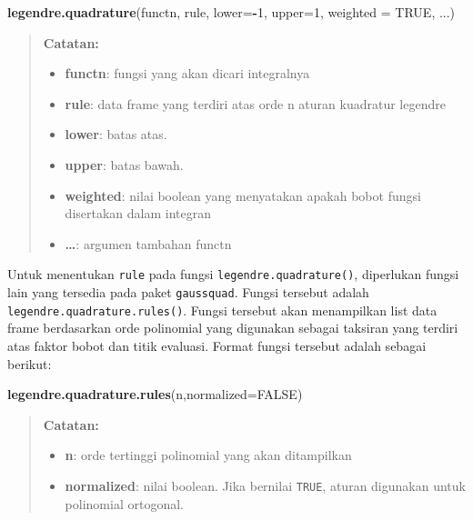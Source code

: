 \documentclass[]{book}
\newenvironment{Shaded}{\begin{snugshade}}{\end{snugshade}}
\newcommand{\DataTypeTok}[1]{\textcolor[rgb]{0.13,0.29,0.53}{#1}}
\newcommand{\DecValTok}[1]{\textcolor[rgb]{0.00,0.00,0.81}{#1}}
\newcommand{\KeywordTok}[1]{\textcolor[rgb]{0.13,0.29,0.53}{\textbf{#1}}}
\newcommand{\NormalTok}[1]{#1}
\newcommand{\OperatorTok}[1]{\textcolor[rgb]{0.81,0.36,0.00}{\textbf{#1}}}
\newcommand{\OtherTok}[1]{\textcolor[rgb]{0.56,0.35,0.01}{#1}}
\providecommand{\tightlist}{%
  \setlength{\itemsep}{0pt}\setlength{\parskip}{0pt}}
\theoremstyle{definition}
\theoremstyle{definition}
\theoremstyle{definition}
\theoremstyle{remark}
\begin{document}
\begin{Shaded}
\begin{Highlighting}[]
\KeywordTok{legendre.quadrature}\NormalTok{(functn, rule, }\DataTypeTok{lower=}\OperatorTok{-}\DecValTok{1}\NormalTok{, }\DataTypeTok{upper=}\DecValTok{1}\NormalTok{, }
  \DataTypeTok{weighted =} \OtherTok{TRUE}\NormalTok{, ...)}
\end{Highlighting}
\end{Shaded}

\begin{quote}
\textbf{Catatan:}

\begin{itemize}
\tightlist
\item
  \textbf{functn}: fungsi yang akan dicari integralnya
\item
  \textbf{rule}: data frame yang terdiri atas orde n aturan kuadratur legendre
\item
  \textbf{lower}: batas atas.
\item
  \textbf{upper}: batas bawah.
\item
  \textbf{weighted}: nilai boolean yang menyatakan apakah bobot fungsi disertakan dalam integran
\item
  \textbf{\ldots{}}: argumen tambahan functn
\end{itemize}
\end{quote}

Untuk menentukan \texttt{rule} pada fungsi \texttt{legendre.quadrature()}, diperlukan fungsi lain yang tersedia pada paket \texttt{gaussquad}. Fungsi tersebut adalah \texttt{legendre.quadrature.rules()}. Fungsi tersebut akan menampilkan list data frame berdasarkan orde polinomial yang digunakan sebagai taksiran yang terdiri atas faktor bobot dan titik evaluasi. Format fungsi tersebut adalah sebagai berikut:

\begin{Shaded}
\begin{Highlighting}[]
\KeywordTok{legendre.quadrature.rules}\NormalTok{(n,}\DataTypeTok{normalized=}\OtherTok{FALSE}\NormalTok{)}
\end{Highlighting}
\end{Shaded}

\begin{quote}
\textbf{Catatan:}

\begin{itemize}
\tightlist
\item
  \textbf{n}: orde tertinggi polinomial yang akan ditampilkan
\item
  \textbf{normalized}: nilai boolean. Jika bernilai \texttt{TRUE}, aturan digunakan untuk polinomial ortogonal.
\end{itemize}
\end{quote}
\end{document}
